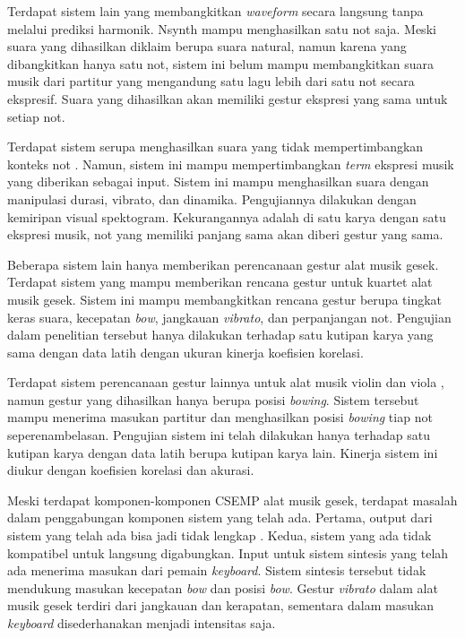 Terdapat sistem lain yang membangkitkan \textit{waveform} secara langsung tanpa melalui prediksi harmonik. Nsynth \parencite{nsynth2017} mampu menghasilkan satu not saja. Meski suara yang dihasilkan diklaim berupa suara natural, namun karena yang dibangkitkan hanya satu not, sistem ini belum mampu membangkitkan suara musik dari partitur yang mengandung satu lagu lebih dari satu not secara ekspresif. Suara yang dihasilkan akan memiliki gestur ekspresi yang sama untuk setiap not.

Terdapat sistem serupa menghasilkan suara yang tidak mempertimbangkan konteks not \parencite{yang2016synthesis}. Namun, sistem ini mampu mempertimbangkan \textit{term} ekspresi musik yang diberikan sebagai input. Sistem ini mampu menghasilkan suara dengan manipulasi durasi, vibrato, dan dinamika. Pengujiannya dilakukan dengan kemiripan visual spektogram. Kekurangannya adalah di satu karya dengan satu ekspresi musik, not yang memiliki panjang sama akan diberi gestur yang sama.

Beberapa sistem lain hanya memberikan perencanaan gestur alat musik gesek. Terdapat sistem yang mampu memberikan rencana gestur untuk kuartet alat musik gesek. \parencite{marchini2014quartet} Sistem ini mampu membangkitkan rencana gestur berupa tingkat keras suara, kecepatan \textit{bow}, jangkauan \textit{vibrato}, dan perpanjangan not. Pengujian dalam penelitian tersebut hanya dilakukan terhadap satu kutipan karya yang sama dengan data latih dengan ukuran kinerja koefisien korelasi.

Terdapat sistem perencanaan gestur lainnya untuk alat musik violin dan viola \parencite{yu2017bowing}, namun gestur yang dihasilkan hanya berupa posisi \textit{bowing}. Sistem tersebut mampu menerima masukan partitur dan menghasilkan posisi \textit{bowing} tiap not seperenambelasan. Pengujian sistem ini telah dilakukan hanya terhadap satu kutipan karya dengan data latih berupa kutipan karya lain. Kinerja sistem ini diukur dengan koefisien korelasi dan akurasi.

Meski terdapat komponen-komponen CSEMP alat musik gesek, terdapat masalah dalam penggabungan komponen sistem yang telah ada. Pertama, output dari sistem yang telah ada bisa jadi tidak lengkap \parencite{yu2017bowing}. Kedua, sistem yang ada tidak kompatibel untuk langsung digabungkan. Input untuk sistem sintesis yang telah ada \parencite{lindemann2007rpm} menerima masukan dari pemain \textit{keyboard}. Sistem sintesis tersebut tidak mendukung masukan kecepatan \textit{bow} \parencite{marchini2014quartet}\parencite{yu2017bowing} dan posisi \textit{bow}\parencite{yu2017bowing}. Gestur \textit{vibrato} dalam alat musik gesek terdiri dari jangkauan dan kerapatan, sementara dalam masukan \textit{keyboard} disederhanakan menjadi intensitas saja.

